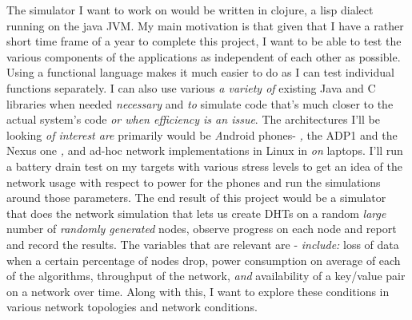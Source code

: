 \documentclass[a4paper,10pt]{article}
\newcommand{\cmt}[2]{{\color{red}#1} \emph{\color{green} #2}}
\begin{document}
The simulator I want to work on would be written in clojure, a lisp dialect running on the \cmt{java}{} JVM. My main motivation is that given that I have a rather short time frame of a year to complete this project, I want to be able to test the various components of the applications as independent of each other as possible. Using a functional language makes it much easier to do as I can test individual functions separately. I can also use \cmt{various}{a variety of} existing Java and C libraries when \cmt{needed}{necessary} \cmt{and}{to} simulate code that's much closer to the actual system\cmt{'s}{} code \cmt{}{or when efficiency is an issue}. The architectures \cmt{I'll be looking}{of interest are} primarily \cmt{would be} Android phones\cmt{-}{,} the ADP1 and the Nexus one\cmt{}{,} and ad-hoc network implementations in Linux \cmt{in}{on} laptops. I'll run a battery drain test on my targets with various stress levels to get an idea of the network usage with respect to power for the phones and run the simulations around those parameters.
The end result of this project would be a simulator that does the network simulation that lets us create DHTs on a \cmt{random}{large} number of \cmt{}{randomly generated} nodes, observe progress on each node and report and record the results. The variables that are relevant \cmt{are -}{include:} loss of data when a certain percentage of nodes drop, power consumption on average of each of the algorithms, throughput of the network, \cmt{}{and} availability of a key/value pair on a network over time. Along with this, I want to explore these conditions in various network topologies and network conditions.

\end{document}
